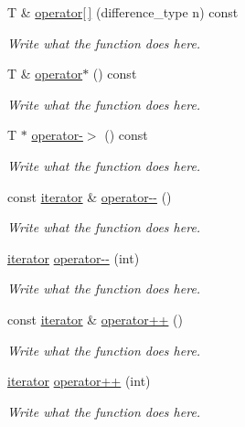 \begin{DoxyCompactItemize}
\item 
T \& \hyperlink{classcircularDeque_1_1iterator_a21a49d0edbe140af0ed4b8ef1734f439}{operator\mbox{[}$\,$\mbox{]}} (difference\+\_\+type n) const 
\begin{DoxyCompactList}\small\item\em Write what the function does here. \end{DoxyCompactList}\item 
T \& \hyperlink{classcircularDeque_1_1iterator_af85542e8915ee6e3cfd958221a789a52}{operator$\ast$} () const 
\begin{DoxyCompactList}\small\item\em Write what the function does here. \end{DoxyCompactList}\item 
T $\ast$ \hyperlink{classcircularDeque_1_1iterator_ad2d0ef1f228b917212a6d7a84fa6c938}{operator-\/$>$} () const 
\begin{DoxyCompactList}\small\item\em Write what the function does here. \end{DoxyCompactList}\item 
const \hyperlink{classcircularDeque_1_1iterator}{iterator} \& \hyperlink{classcircularDeque_1_1iterator_ad85f34565b4f79c0e9c758e75594d04c}{operator-\/-\/} ()
\begin{DoxyCompactList}\small\item\em Write what the function does here. \end{DoxyCompactList}\item 
\hyperlink{classcircularDeque_1_1iterator}{iterator} \hyperlink{classcircularDeque_1_1iterator_a601345dba4440eaa80c372d8d6b1fd72}{operator-\/-\/} (int)
\begin{DoxyCompactList}\small\item\em Write what the function does here. \end{DoxyCompactList}\item 
const \hyperlink{classcircularDeque_1_1iterator}{iterator} \& \hyperlink{classcircularDeque_1_1iterator_a54abaeb1841ae8384be053ca64d75e03}{operator++} ()
\begin{DoxyCompactList}\small\item\em Write what the function does here. \end{DoxyCompactList}\item 
\hyperlink{classcircularDeque_1_1iterator}{iterator} \hyperlink{classcircularDeque_1_1iterator_a770427aacdfea8b4f452bde2a38fe622}{operator++} (int)
\begin{DoxyCompactList}\small\item\em Write what the function does here. \end{DoxyCompactList}\end{DoxyCompactItemize}
